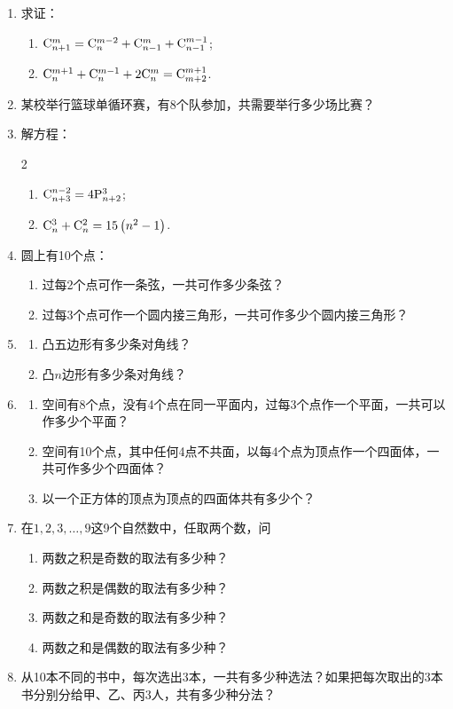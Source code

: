 \begin{enumerate}
    \item 求证：
\begin{enumerate}[(1)]
    \item $\comb{n+1}{m}=\comb{n}{m-2}+\comb{n-1}{m}+\comb{n-1}{m-1}$;
    \item $\comb{n}{m+1}+\comb{n}{m-1}+2\comb{n}{m}=\comb{m+2}{m+1}$.
\end{enumerate}
\item 某校举行篮球单循环赛，有8个队参加，共需要举行多少场比赛？
\item 
解方程：
\begin{multicols}{2}
\begin{enumerate}[(1)]
    \item $\comb{n+3}{n-2}=4\perm{n+2}{3}$;
    \item $\comb{n}{3}+\comb{n}{2}=15\left(n^{2}-1\right)$.
\end{enumerate}
\end{multicols}

\item 圆上有10个点：
\begin{enumerate}[(1)]
    \item  过每2个点可作一条弦，一共可作多少条弦？
    \item 过每3个点可作一个圆内接三角形，一共可作多少个圆内接三角形？
\end{enumerate}

\item 
\begin{enumerate}[(1)]
    \item     凸五边形有多少条对角线？
    \item     凸$n$边形有多少条对角线？
\end{enumerate}
\item 
\begin{enumerate}[(1)]
    \item     空间有8个点，没有4个点在同一平面内，过每3个点作一个平面，一共可以作多少个平面？
    \item     空间有10个点，其中任何4点不共面，以每4个点为顶点作一个四面体，一共可作多少个四面体？
    \item 以一个正方体的顶点为顶点的四面体共有多少个？
\end{enumerate}
\item 在$1,2,3,\ldots,9$这9个自然数中，任取两个数，问
\begin{enumerate}[(1)]
    \item     两数之积是奇数的取法有多少种？
  \item     两数之积是偶数的取法有多少种？
  \item     两数之和是奇数的取法有多少种？
  \item 两数之和是偶数的取法有多少种？
\end{enumerate}
\item 从10本不同的书中，每次选出3本，一共有多少种选法？如果把每次取出的3本书分别分给甲、乙、丙3人，共有多少种分法？
\end{enumerate}


